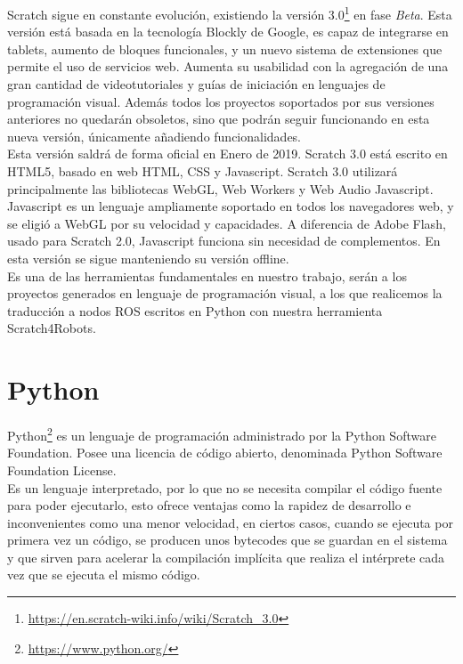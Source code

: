 Scratch sigue en constante evolución, existiendo la versión 3.0\footnote{\url{https://en.scratch-wiki.info/wiki/Scratch_3.0}} en fase \textit{Beta}. Esta versión está basada en la tecnología Blockly de Google, es capaz de integrarse en tablets, aumento de bloques funcionales, y un nuevo sistema de extensiones que permite el uso de servicios web. Aumenta su usabilidad con la agregación de una gran cantidad de videotutoriales y guías de iniciación en lenguajes de programación visual. Además todos los proyectos soportados por sus versiones anteriores no quedarán obsoletos, sino que podrán seguir funcionando en esta nueva versión, únicamente añadiendo funcionalidades.\\

Esta versión saldrá de forma oficial en Enero de 2019. Scratch 3.0 está escrito en HTML5, basado en web HTML, CSS y Javascript. Scratch 3.0 utilizará principalmente las bibliotecas WebGL, Web Workers y Web Audio Javascript. Javascript es un lenguaje ampliamente soportado en todos los navegadores web, y se eligió a WebGL por su velocidad y capacidades. A diferencia de Adobe Flash, usado para Scratch 2.0, Javascript funciona sin necesidad de complementos. En esta versión se sigue manteniendo su versión offline.\\

Es una de las herramientas fundamentales en nuestro trabajo, serán a los proyectos generados en lenguaje de programación visual, a los que realicemos la traducción a nodos ROS escritos en Python con nuestra herramienta Scratch4Robots.

\section{Python}
\label{sec:python}
 
Python\footnote{\url{https://www.python.org/}} es un lenguaje de programación administrado por la Python Software Foundation. Posee una licencia de código abierto, denominada Python Software Foundation License.\\

Es un lenguaje interpretado, por lo que no se necesita compilar el código fuente para poder ejecutarlo, esto ofrece ventajas como la rapidez de desarrollo e inconvenientes como una menor velocidad, en ciertos casos, cuando se ejecuta por primera vez un código, se producen unos bytecodes que se guardan en el sistema y que sirven para acelerar la compilación implícita que realiza el intérprete cada vez que se ejecuta el mismo código. \\

